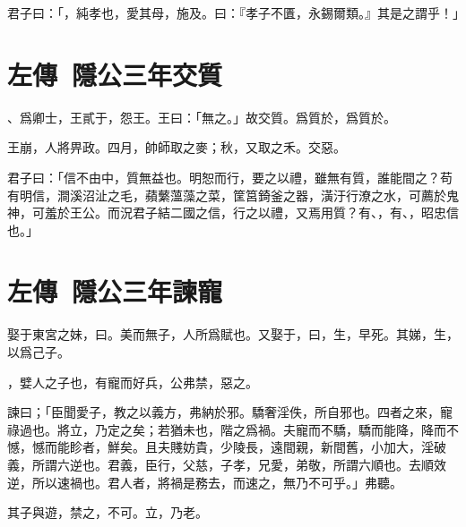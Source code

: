 君子曰：「，純孝也，愛其母，施及。曰：『孝子不匱，永錫爾類。』其是之謂乎！」

\section[周鄭交質\quad{\small 左傳\ 隱公三年}]{{\normalsize 左傳\ 隱公三年}\quad {}交質}
、爲卿士，王貳于，怨王。王曰：「無之。」故交質。爲質於，爲質於。

王崩，人將畀政。四月，帥師取之麥；秋，又取之禾。交惡。

君子曰：「信不由中，質無益也。明恕而行，要之以禮，雖無有質，誰能間之？苟有明信，澗溪沼沚之毛，蘋蘩薀藻之菜，筐筥錡釜之器，潢汙行潦之水，可薦於鬼神，可羞於王公。而況君子結二國之信，行之以禮，又焉用質？有、，有、，昭忠信也。」

\section[石碏諫寵州吁\quad{\small 左傳\ 隱公三年}]{{\normalsize 左傳\ 隱公三年}\quad {}諫寵}
娶于東宮之妹，曰。美而無子，人所爲賦也。又娶于，曰，生，早死。其娣，生，以爲己子。

，嬖人之子也，有寵而好兵，公弗禁，惡之。

諫曰；「臣聞愛子，教之以義方，弗納於邪。驕奢淫佚，所自邪也。四者之來，寵祿過也。將立，乃定之矣；若猶未也，階之爲禍。夫寵而不驕，驕而能降，降而不憾，憾而能眕者，鮮矣。且夫賤妨貴，少陵長，遠間親，新間舊，小加大，淫破義，所謂六逆也。君義，臣行，父慈，子孝，兄愛，弟敬，所謂六順也。去順效逆，所以速禍也。君人者，將禍是務去，而速之，無乃不可乎。」弗聽。

其子與遊，禁之，不可。立，乃老。

